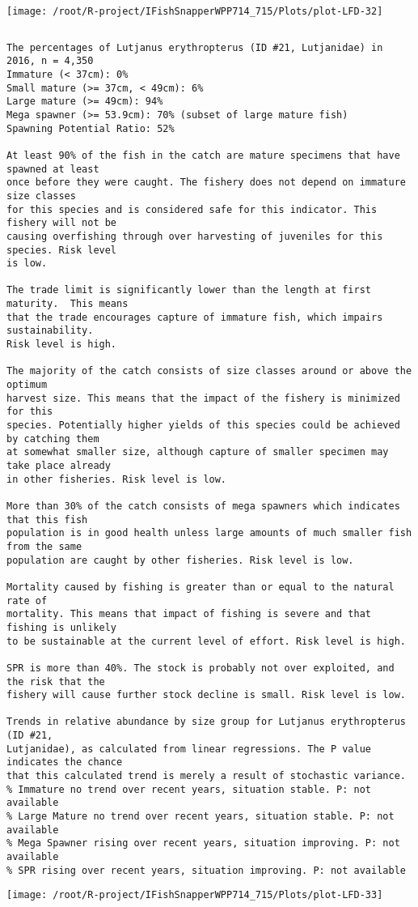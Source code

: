 \documentclass{report}\usepackage[]{graphicx}\usepackage[]{color}
\makeatletter
\def\maxwidth{ %
  \ifdim\Gin@nat@width>\linewidth
    \linewidth
  \else
    \Gin@nat@width
  \fi
}
\newenvironment{kframe}{%
 \def\at@end@of@kframe{}%
 \ifinner\ifhmode%
  \def\at@end@of@kframe{\end{minipage}}%
  \begin{minipage}{\columnwidth}%
 \fi\fi%
 \def\FrameCommand##1{\hskip\@totalleftmargin \hskip-\fboxsep
 \colorbox{shadecolor}{##1}\hskip-\fboxsep
     \hskip-\linewidth \hskip-\@totalleftmargin \hskip\columnwidth}%
 \MakeFramed {\advance\hsize-\width
   \@totalleftmargin\z@ \linewidth\hsize
   \@setminipage}}%
 {\par\unskip\endMakeFramed%
 \at@end@of@kframe}
\newenvironment{knitrout}{}{} %
\makeatother
\begin{document}
\begin{knitrout}
\texttt{[image: /root/R-project/IFishSnapperWPP714\_715/Plots/plot-LFD-32]} 
\begin{kframe}\begin{verbatim}
\end{verbatim}
\end{kframe}
\clearpage
\newpage
\begin{kframe}\begin{verbatim}The percentages of Lutjanus erythropterus (ID #21, Lutjanidae) in 2016, n = 4,350
Immature (< 37cm): 0%
Small mature (>= 37cm, < 49cm): 6%
Large mature (>= 49cm): 94%
Mega spawner (>= 53.9cm): 70% (subset of large mature fish)
Spawning Potential Ratio: 52%
 
At least 90% of the fish in the catch are mature specimens that have spawned at least
once before they were caught. The fishery does not depend on immature size classes
for this species and is considered safe for this indicator. This fishery will not be
causing overfishing through over harvesting of juveniles for this species. Risk level
is low.

The trade limit is significantly lower than the length at first maturity.  This means
that the trade encourages capture of immature fish, which impairs sustainability.
Risk level is high.

The majority of the catch consists of size classes around or above the optimum
harvest size. This means that the impact of the fishery is minimized for this
species. Potentially higher yields of this species could be achieved by catching them
at somewhat smaller size, although capture of smaller specimen may take place already
in other fisheries. Risk level is low.

More than 30% of the catch consists of mega spawners which indicates that this fish
population is in good health unless large amounts of much smaller fish from the same
population are caught by other fisheries. Risk level is low.
 
Mortality caused by fishing is greater than or equal to the natural rate of
mortality. This means that impact of fishing is severe and that fishing is unlikely
to be sustainable at the current level of effort. Risk level is high.
 
SPR is more than 40%. The stock is probably not over exploited, and the risk that the
fishery will cause further stock decline is small. Risk level is low.
 
Trends in relative abundance by size group for Lutjanus erythropterus (ID #21,
Lutjanidae), as calculated from linear regressions. The P value indicates the chance
that this calculated trend is merely a result of stochastic variance.
% Immature no trend over recent years, situation stable. P: not available
% Large Mature no trend over recent years, situation stable. P: not available
% Mega Spawner rising over recent years, situation improving. P: not available
% SPR rising over recent years, situation improving. P: not available
\end{verbatim}
\end{kframe}
\texttt{[image: /root/R-project/IFishSnapperWPP714\_715/Plots/plot-LFD-33]} 


\end{knitrout}
\end{document}
